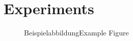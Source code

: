 \chapter{Experiments}
\label{ch:experiments}

\Blindtext

\begin{figure}[ht]
	\centering
	
	\caption{\ifde Beispielabbildung\else Example Figure\fi}
	\label{fig:example}
\end{figure}

\Blindtext

